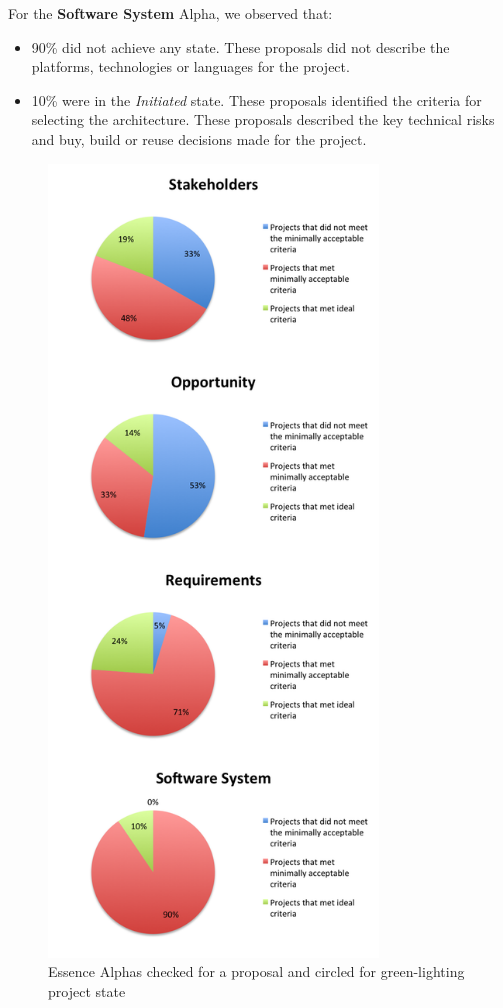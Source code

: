 For the \textbf{Software System} Alpha, we observed that:
\begin{itemize}
\itemsep1pt\parskip0pt
\item
  90\% did not achieve any state. These proposals did not describe the
  platforms, technologies or languages for the project.
\item
  10\% were in the \textit{Initiated} state. These proposals identified the
  criteria for selecting the architecture. These proposals described the key technical risks and buy, build or reuse decisions made for the project.
\end{itemize}

\begin{figure}[!t]
\centering
\includegraphics[width=3.45in]{essence_green_lighting_images/ProposalAlphasChartsStacked.png}
\caption{Essence Alphas checked for a proposal and circled for green-lighting project state}
\label{ProposalChart}
\end{figure}



